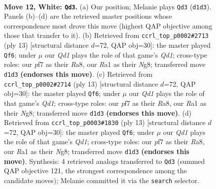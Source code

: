\documentclass[11pt]{article}
\begin{document}
\clearpage

\begin{figure}[p]\centering
\begin{subfigure}{0.46\textwidth}\centering
\resizebox{\linewidth}{!}{%
\newchessgame
\chessboard[
  setfen={rn2qrk1/p1p1pp1p/5bp1/1p1P4/2B1P3/B1P4P/P4P1P/R2QK2R w KQ - 0 12},
  showmover=false,
  pgfstyle=straightmove, color=movearrow, markmove={d1-d3}
]}
\caption{}
\end{subfigure}\hfill
\begin{subfigure}{0.46\textwidth}\centering
\resizebox{\linewidth}{!}{%
\newchessgame
\chessboard[
  setfen={r2qkbnr/1pp2pp1/p1p5/4p2p/4P1b1/3P1N1P/PPP2PP1/RNBQ1RK1 b kq - 0 7},
  showmover=false,
  pgfstyle=straightmove, color=movearrow, markmove={d8-f6}
]}
\caption{}
\end{subfigure}
\\[4pt]
\begin{subfigure}{0.46\textwidth}\centering
\resizebox{\linewidth}{!}{%
\newchessgame
\chessboard[
  setfen={r2qkbnr/1pp2pp1/p1p5/4p2p/4P1b1/3P1N1P/PPP2PP1/RNBQ1RK1 b kq - 0 7},
  showmover=false,
  pgfstyle=straightmove, color=movearrow, markmove={d8-f6}
]}
\caption{}
\end{subfigure}\hfill
\begin{subfigure}{0.46\textwidth}\centering
\resizebox{\linewidth}{!}{%
\newchessgame
\chessboard[
  setfen={r2qkbnr/1pp2pp1/p1p5/4p2p/4P1b1/3P1N1P/PPP2PP1/RNBQ1RK1 b kq - 0 7},
  showmover=false,
  pgfstyle=straightmove, color=movearrow, markmove={d8-f6}
]}
\caption{}
\end{subfigure}
\caption{\textbf{Move 12, White: \texttt{Qd3}.} (a) Our position; Melanie plays \texttt{Qd3} (\texttt{d1d3}). Panels (b)--(d) are the retrieved master positions whose correspondence most drove this move (highest QAP objective among those that transfer to it). (b) Retrieved from \texttt{ccrl\_top\_p0002\#2713} (ply 13) [structural distance $d$=72, QAP obj=30]: the master played \texttt{Qf6}; under $\mu$ our \emph{Qd1} plays the role of that game's \emph{Qd1}; cross-type roles: our \emph{p}f7 as their \emph{R}a8, our \emph{R}a1 as their \emph{N}g8; transferred move \texttt{d1d3} \textbf{(endorses this move)}. (c) Retrieved from \texttt{ccrl\_top\_p0002\#2714} (ply 13) [structural distance $d$=72, QAP obj=30]: the master played \texttt{Qf6}; under $\mu$ our \emph{Qd1} plays the role of that game's \emph{Qd1}; cross-type roles: our \emph{p}f7 as their \emph{R}a8, our \emph{R}a1 as their \emph{N}g8; transferred move \texttt{d1d3} \textbf{(endorses this move)}. (d) Retrieved from \texttt{ccrl\_top\_p0003\#1830} (ply 13) [structural distance $d$=72, QAP obj=30]: the master played \texttt{Qf6}; under $\mu$ our \emph{Qd1} plays the role of that game's \emph{Qd1}; cross-type roles: our \emph{p}f7 as their \emph{R}a8, our \emph{R}a1 as their \emph{N}g8; transferred move \texttt{d1d3} \textbf{(endorses this move)}. Synthesis: 4 retrieved analogs transferred to \texttt{Qd3} (summed QAP objective 121, the strongest correspondence among the candidate moves); Melanie committed it via the \texttt{search} selector.}
\label{fig:thought-m22}
\end{figure}
\end{document}
